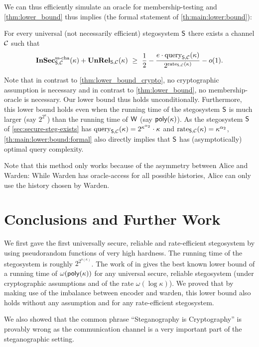 We can thus efficiently simulate an oracle for membership-testing and
\autoref{thm:lower_bound} thus implies 
(the formal statement of \autoref{th:main:lower:bound}):
\begin{theorem}
\label{th:main:lower:bound:formal}
  For every universal (not necessarily efficient) stegosystem
  $\operatorname{\mathsf{S}}$   there exists a channel $\mathcal{C}$ such that  
  \[
    \InSec^{\sscha}_{\Steg,\chan}(\kappa) + \unrel_{\Steg,\chan}(\kappa) \ \ge \ 
       \frac{1}{2} - \frac{e\cdot \query_{\Steg,\chan}(\kappa)}{2^{\rate_{\Steg,\chan}(\kappa)}} - o(1).
  \]
\end{theorem}
Note that in contrast to \autoref{thm:lower_bound_crypto}, no
cryptographic assumption is necessary and in contrast to 
\autoref{thm:lower_bound}, no membership-oracle is necessary. Our lower
bound thus holds unconditionally. Furthermore, this lower bound holds
even when the running time of the stegosystem $\operatorname{\mathsf{S}}$ is much larger (say
$2^{2^{\kappa}}$) than the running time of $\operatorname{\mathsf{W}}$ (say
$\operatorname{\mathsf{poly}}(\kappa)$). As the stegosystem $\operatorname{\mathsf{S}}$ of
\autoref{sec:secure-steg-exists} has $\operatorname{query}_{\operatorname{\mathsf{S}},\mathcal{C}}(\kappa)=2^{\kappa^{\alpha_{2}}}\cdot \kappa$
and $\operatorname{rate}_{\operatorname{\mathsf{S}},\mathcal{C}}(\kappa)=\kappa^{\alpha_{2}}$,
\autoref{th:main:lower:bound:formal} also directly implies that
  $\operatorname{\mathsf{S}}$ has (asymptotically) optimal query complexity. 

Note that this method only works because of the asymmetry between Alice
and Warden: While Warden has oracle-access for all possible histories,
Alice can only use the history chosen by Warden.

\section{Conclusions and Further Work}


We first gave the first universally secure, reliable and rate-efficient stegosystem by using
pseudorandom functions of very high hardness. The running time of the
stegosystem is roughly $2^{2^{o(\kappa)}}$.
The work of \citeauthor{dedic2009lower} in \cite{dedic2009lower}
gives the best known lower bound of a running
time of $\omega(\operatorname{\mathsf{poly}}(\kappa))$ for any universal secure, reliable 
stegosystem (under cryptographic assumptions and of the rate $\omega(\log \kappa)$). We proved
that by making use of the imbalance between encoder and warden, this
lower bound also holds without any assumption and for any rate-efficient stegosystem.  

We also showed that the common phrase ``Steganography is Cryptography'' is
provably wrong as the communication channel is a very important part of
the steganographic setting. 






